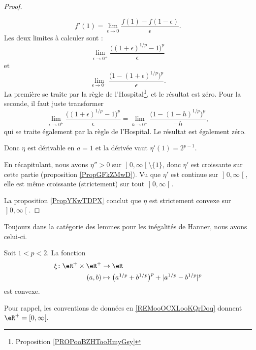 \begin{proof}
\begin{subproof}
			\begin{equation}
				f'(1)=\lim_{\epsilon\to 0}\frac{ f(1)-f(1-\epsilon) }{ \epsilon }.
			\end{equation}
			Les deux limites à calculer sont :
			\begin{equation}
				\lim_{\epsilon\to 0^+}\frac{ \big( (1+\epsilon)^{1/p}-1 \big)^p }{ \epsilon }
			\end{equation}
			et
			\begin{equation}
				\lim_{\epsilon\to 0^-}\frac{ \big( 1-(1+\epsilon)^{1/p} \big)^p }{ \epsilon }.
			\end{equation}
			La première se traite par la règle de l'Hospital\footnote{Proposition \ref{PROPooBZHTooHmyGsy}}, et le résultat est zéro. Pour la seconde, il faut juste transformer
			\begin{equation}
				\lim_{\epsilon\to 0^+}\frac{ \big( (1+\epsilon)^{1/p}-1 \big)^p }{ \epsilon }=\lim_{h\to 0^+} \frac{ \big( 1-(1-h)^{1/p} \big)^p }{ -h },
			\end{equation}
			qui se traite également par la règle de l'Hospital. Le résultat est également zéro.

			Donc \( \eta\) est dérivable en \( a=1\) et la dérivée vaut \(\eta'(1)= 2^{p-1}\).
		\end{subproof}
		En récapitulant, nous avons \( \eta''>0\) sur \( \mathopen] 0  , \infty \mathclose[\setminus\{ 1 \}\), donc \( \eta'\) est croissante sur cette partie (proposition \ref{PropGFkZMwD}). Vu que \( \eta'\) est continue sur \( \mathopen] 0 , \infty \mathclose[\), elle est même croissante (strictement) sur tout \( \mathopen] 0 , \infty \mathclose[\).

		La proposition \ref{PropYKwTDPX} conclut que \( \eta\) est strictement convexe sur \( \mathopen] 0 , \infty \mathclose[\).
\end{proof}

Toujours dans la catégorie des lemmes pour les inégalités de Hanner, nous avons celui-ci.
\begin{lemma}
	Soit \( 1<p<2\). La fonction
	\begin{equation}
		\begin{aligned}
			\xi\colon \eR^+\times \eR^+ & \to \eR                                                     \\
			(a,b)                       & \mapsto \big( a^{1/p}+b^{1/p} \big)^p+| a^{1/p}-b^{1/p} |^p
		\end{aligned}
	\end{equation}
	est convexe.

	Pour rappel, les conventions de données en \ref{REMooOCXLooKQrDoq} donnent \( \eR^+=\mathopen[ 0 , \infty \mathclose[\).
\end{lemma}

